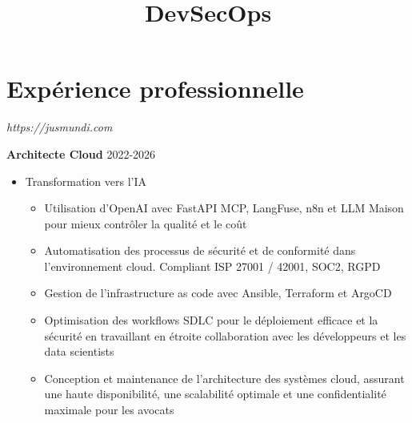 \documentclass[11pt,a4paper]{moderncv}
\title{DevSecOps}
\begin{document}
\makecvtitle

\section{Expérience professionnelle}

{
\textit{https://jusmundi.com}
\bigskip

\textbf{Architecte Cloud} \hfill 2022-2026
	\begin{itemize}%
		\item Transformation vers l'IA
			\begin{itemize}%
				\item Utilisation d'OpenAI avec FastAPI MCP, LangFuse, n8n et LLM Maison pour mieux contrôler la qualité et le coût
				\item Automatisation des processus de sécurité et de conformité dans l'environnement cloud. Compliant ISP 27001 / 42001, SOC2, RGPD
				\item Gestion de l'infrastructure as code avec Ansible, Terraform et ArgoCD
				\item Optimisation des workflows SDLC pour le déploiement efficace et la sécurité en travaillant en étroite collaboration avec les développeurs et les data scientists
				\item Conception et maintenance de l'architecture des systèmes cloud, assurant une haute disponibilité, une scalabilité optimale et une confidentialité maximale pour les avocats
			\end{itemize}
	\end{itemize}
}
\bigskip
{}
\end{document}
